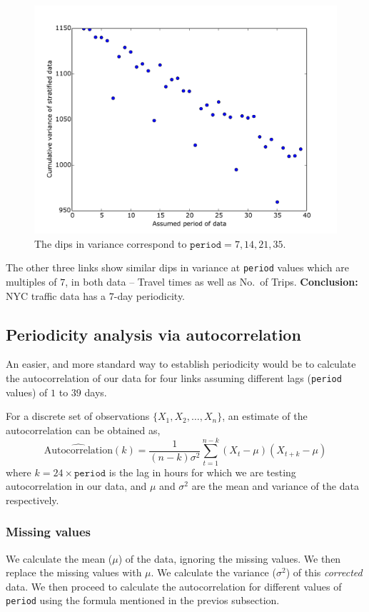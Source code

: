 \documentclass[10pt,a4paper]{amsart}
\begin{document}
\begin{figure}[hbtp]
\centering
\includegraphics[scale=0.5]{Figures/Periodicity_analysis_BA_Trips.pdf} 
\caption{The dips in variance correspond to \(\mathtt{period}=7,14,21,35\).}
\end{figure}

The other three links show similar dips in variance at \texttt{period} values
which are multiples of \(7\), in both data -- Travel times as well as No.\ of
Trips. \textbf{Conclusion:} NYC traffic data has a \(7\)-day periodicity.

\subsection{Periodicity analysis via autocorrelation}
An easier, and more standard way to establish periodicity would be to
calculate the autocorrelation of our data for four links assuming different
lags (\texttt{period} values) of \(1\) to \(39\) days.

For a discrete set of observations \(\{X_1, X_2, \ldots, X_n\}\), an estimate
of the autocorrelation can be obtained as,
	\[\widehat{\mbox{Autocorrelation}}(k) = \frac{1}{(n-k)\sigma^2}
		\sum_{t=1}^{n-k}(X_t-\mu)(X_{t+k}-\mu)\]
where \(k=24\times\mathtt{period}\) is the lag in hours for which we are
testing autocorrelation in our data, and \(\mu\) and \(\sigma^2\) are the mean
and variance of the data respectively.

\subsubsection{Missing values}
We calculate the mean (\(\mu\)) of the data, ignoring the missing values. We
then replace the missing values with \(\mu\). We calculate the variance
(\(\sigma^2\)) of this \emph{corrected} data.
We then proceed to calculate the autocorrelation for different values of
\texttt{period} using the formula mentioned in the previos subsection.
\end{document}

